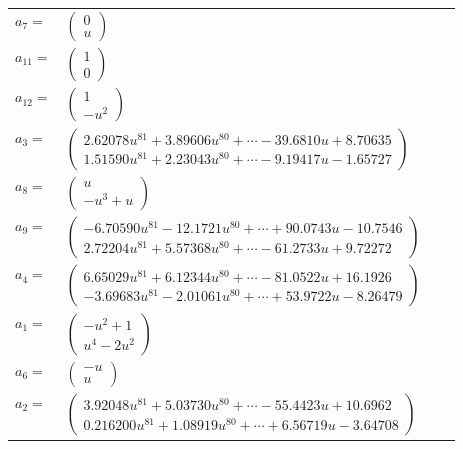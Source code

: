 \documentclass[1p]{elsarticle_modified}
\theoremstyle{definition}
\begin{document}
\begin{tabular}{m{7pt} m{180pt} m{7pt} m{180pt} }
\flushright $a_{7}=$&$\begin{pmatrix}0\\u\end{pmatrix}$ \\
\flushright $a_{11}=$&$\begin{pmatrix}1\\0\end{pmatrix}$ \\
\flushright $a_{12}=$&$\begin{pmatrix}1\\- u^2\end{pmatrix}$ \\
\flushright $a_{3}=$&$\begin{pmatrix}2.62078 u^{81}+3.89606 u^{80}+\cdots-39.6810 u+8.70635\\1.51590 u^{81}+2.23043 u^{80}+\cdots-9.19417 u-1.65727\end{pmatrix}$ \\
\flushright $a_{8}=$&$\begin{pmatrix}u\\- u^3+u\end{pmatrix}$ \\
\flushright $a_{9}=$&$\begin{pmatrix}-6.70590 u^{81}-12.1721 u^{80}+\cdots+90.0743 u-10.7546\\2.72204 u^{81}+5.57368 u^{80}+\cdots-61.2733 u+9.72272\end{pmatrix}$ \\
\flushright $a_{4}=$&$\begin{pmatrix}6.65029 u^{81}+6.12344 u^{80}+\cdots-81.0522 u+16.1926\\-3.69683 u^{81}-2.01061 u^{80}+\cdots+53.9722 u-8.26479\end{pmatrix}$ \\
\flushright $a_{1}=$&$\begin{pmatrix}- u^2+1\\u^4-2 u^2\end{pmatrix}$ \\
\flushright $a_{6}=$&$\begin{pmatrix}- u\\u\end{pmatrix}$ \\
\flushright $a_{2}=$&$\begin{pmatrix}3.92048 u^{81}+5.03730 u^{80}+\cdots-55.4423 u+10.6962\\0.216200 u^{81}+1.08919 u^{80}+\cdots+6.56719 u-3.64708\end{pmatrix}$ \\

\end{tabular}
\end{document}
